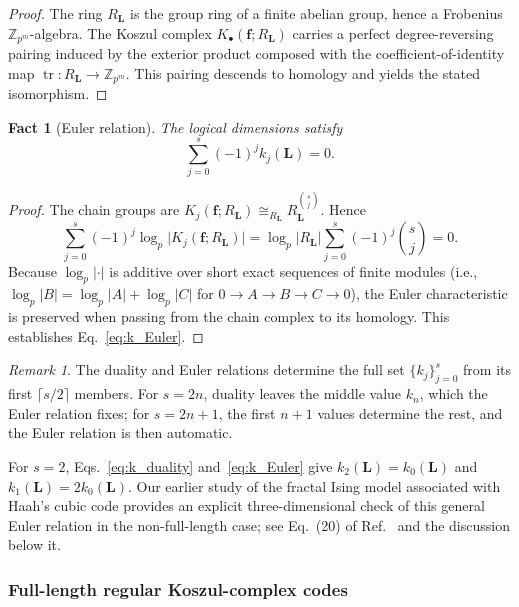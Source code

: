 \documentclass[aps,prx,english,superscriptaddress,twocolumn,tightenlines,showpacs,longbibliography,floatfix,amsfonts]{revtex4-2}
\newtheorem{fact}{Fact}
\theoremstyle{remark}
\newtheorem{remark}{Remark}
\theoremstyle{definition}
\begin{document}
\begin{proof}
	The ring $R_{\mathbf{L}}$ is the group ring of a finite abelian group, hence a Frobenius $\mathbb{Z}_{p^m}$-algebra. The Koszul complex $K_\bullet(\mathbf{f}; R_{\mathbf{L}})$ carries a perfect degree-reversing pairing induced by the exterior product composed with the coefficient-of-identity map $\operatorname{tr}\colon R_{\mathbf{L}}\to\mathbb{Z}_{p^m}$. This pairing descends to homology and yields the stated isomorphism.
\end{proof}


\begin{fact}[Euler relation]
	\label{fact:euler-logical}
	The logical dimensions satisfy
	\begin{equation}
		\sum_{j=0}^{s} (-1)^j k_j(\mathbf{L}) = 0 . \label{eq:k_Euler}
	\end{equation}
\end{fact}
\begin{proof}
	The chain groups are $K_j(\mathbf{f}; R_{\mathbf{L}}) \cong_{R_{\mathbf L}} R_{\mathbf{L}}^{\binom{s}{j}}$.
	Hence
	\[
	\sum_{j=0}^{s} (-1)^j \log_{p}\bigl|K_j(\mathbf{f}; R_{\mathbf{L}})\bigr|
	= \log_{p}|R_{\mathbf{L}}| \sum_{j=0}^{s} (-1)^j \binom{s}{j} = 0 .
	\]
	Because \(\log_p |\cdot|\) is additive over short exact sequences of finite modules (i.e., \(\log_p|B| = \log_p|A| + \log_p|C|\) for \(0 \to A \to B \to C \to 0\)), the Euler characteristic is preserved when passing from the chain complex to its homology. This establishes Eq.~\eqref{eq:k_Euler}.
\end{proof}

\begin{remark}
	The duality and Euler relations determine the full set
	$\{k_j\}_{j=0}^s$ from its first $\lceil s/2\rceil$ members. For
	$s=2n$, duality leaves the middle value $k_n$, which the Euler relation
	fixes; for $s=2n+1$, the first $n+1$ values determine the rest, and the
	Euler relation is then automatic.
\end{remark}

For \(s=2\), Eqs.~\eqref{eq:k_duality} and~\eqref{eq:k_Euler} give
\(k_2(\mathbf L)=k_0(\mathbf L)\) and
\(k_1(\mathbf L)=2k_0(\mathbf L)\). Our earlier study of the fractal Ising
model associated with Haah's cubic code provides an explicit three-dimensional
check of this general Euler relation in the non-full-length case; see Eq.~(20)
of Ref.~\cite{Canossa2024Exotic} and the discussion below it.

\subsubsection{Full-length regular Koszul-complex codes}
\label{subsubsec:full-length-logicals}
\end{document}
